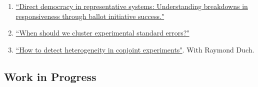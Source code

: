 \documentclass[11pt, a4paper]{article}
\begin{document}
\begin{enumerate}

\item \href{https://ts-robinson.com/publication/robinson-directdemocracyrepresentative-2020/robinson-directdemocracyrepresentative-2020.pdf}{``Direct democracy in representative systems: Understanding breakdowns in responsiveness through ballot initiative success."}


\item \href{https://ts-robinson.com/publication/robinson-whenshouldwe-2020/robinson-whenshouldwe-2020.pdf}{``When should we cluster experimental standard errors?" }

\item \href{https://ts-robinson.com/publication/robinson-conjoint-2021/robinson-conjoint-2021.pdf}{``How to detect heterogeneity in conjoint experiments"}.  With Raymond Duch.

\end{enumerate}

\subsection*{Work in Progress}
\end{document}
